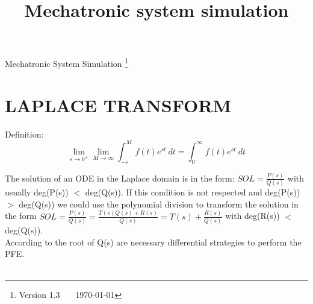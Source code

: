\documentclass[a4paper,12pt]{article}
\title{Mechatronic system simulation}
\begin{document}
	{ \huge
		Mechatronic System Simulation}
	\footnote{Version 1.3 \ \ \ \today}
	\section{LAPLACE TRANSFORM}
	Definition:
	\begin{equation}
		\lim_{\varepsilon \rightarrow 0^+}\lim_{M \rightarrow \infty }\int_{-\varepsilon}^{M} f(t)e^{st} \ dt = \int_{0^-}^{\infty } f(t)e^{st} \ dt
	\end{equation}

	The solution of an ODE in the Laplace domain is in the form: $SOL=\frac{P(s)}{Q(s)}$ with usually deg(P(s)) $<$ deg(Q(s)). If this condition is not respected and deg(P(s)) $>$ deg(Q(s)) we could use the polynomial division to transform the solution in the form $SOL=\frac{P(s)}{Q(s)}=\frac{T(s) Q(s) + R(s)}{Q(s)} = T(s) + \frac{R(s)}{Q(s)}$ with deg(R(s)) $<$ deg(Q(s)).\\
	According to the root of Q(s) are necessary differential strategies to perform the PFE.\\ \\
\end{document}
